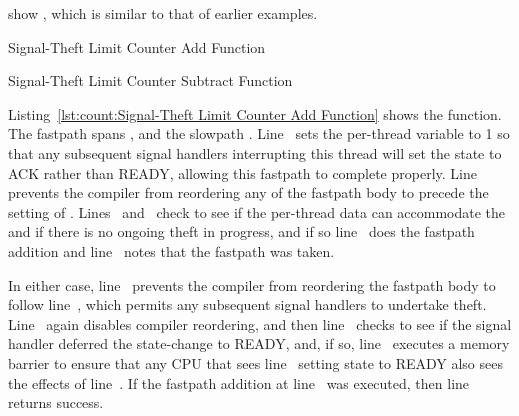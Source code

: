 \QuickQuizEnd

\begin{fcvref}
 show , which is similar to that of
earlier examples.
\end{fcvref}

\begin{listing}

\caption{Signal-Theft Limit Counter Add Function}
\label{lst:count:Signal-Theft Limit Counter Add Function}
\end{listing}

\begin{listing}

\caption{Signal-Theft Limit Counter Subtract Function}
\label{lst:count:Signal-Theft Limit Counter Subtract Function}
\end{listing}

\begin{fcvref}
Listing~\ref{lst:count:Signal-Theft Limit Counter Add Function}
shows the  function.
The fastpath spans , and the slowpath
.
Line~ sets the per-thread  variable to 1 so that
any subsequent signal handlers interrupting this thread will
set the  state to ACK rather than READY, allowing this
fastpath to complete properly.
Line~ prevents the compiler from reordering any of the fastpath body
to precede the setting of .
Lines~ and~ check to see
if the per-thread data can accommodate
the  and if there is no ongoing theft in progress,
and if so line~ does the fastpath addition and
line~ notes that
the fastpath was taken.

In either case, line~ prevents the compiler from reordering the
fastpath body to follow line~, which permits any subsequent signal
handlers to undertake theft.
Line~ again disables compiler reordering, and then
line~
checks to see if the signal handler deferred the 
state-change to READY, and, if so, line~ executes a memory
barrier to ensure that any CPU that sees line~ setting state to
READY also sees the effects of line~.
If the fastpath addition at line~ was executed, then
line~ returns
success.
\end{fcvref}

